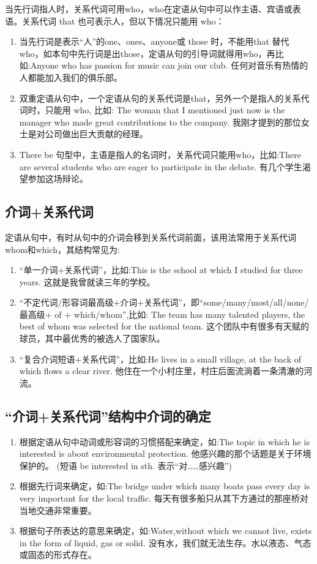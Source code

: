 当先行词指人时，关系代词可用who，who在定语从句中可以作主语、宾语或表语。关系代词 that 也可表示人，但以下情况只能用 who：
\begin{enumerate}
  \item 当先行词是表示“人”的one、ones、anyone或 those 时，不能用that 替代 who，如本句中先行词是出those，定语从句的引导词就得用who，再比如:Anyone who has passion for music can join our club. 任何对音乐有热情的人都能加入我们的俱乐部。
  \item 双重定语从句中，一个定语从句的关系代词是that，另外一个是指人的关系代词时，只能用 who, 比如: The woman that I mentioned just now is the manager who made great contributions to the company. 我刚才提到的那位女士是对公司做出巨大贡献的经理。
  \item There be 句型中，主语是指人的名词时，关系代词只能用who，比如:There are several students who are eager to participate in the debate. 有几个学生渴望参加这场辩论。
\end{enumerate}

\subsection{介词+关系代词}

定语从句中，有时从句中的介词会移到关系代词前面，该用法常用于关系代词whom和which，其结构常见为:
\begin{enumerate}
  \item “单一介词+关系代词”，比如:This is the school at which I studied for three years. 这就是我曾就读三年的学校。
  \item “不定代词/形容词最高级+介词+关系代词”，即“some/many/most/all/none/最高级+ of + which/whom”,比如: The team has many talented players, the best of whom was selected for the national team. 这个团队中有很多有天赋的球员，其中最优秀的被选人了国家队。
  \item “复合介词短语+关系代词”，比如:He lives in a small village, at the back of which flows a clear river. 他住在一个小村庄里，村庄后面流淌着一条清澈的河流。
\end{enumerate}

\subsection{“介词+关系代词”结构中介词的确定}

\begin{enumerate}
  \item 根据定语从句中动词或形容词的习惯搭配来确定，如:The topic in which he is interested is about environmental protection. 他感兴趣的那个话题是关于环境保护的。 (短语 be interested in sth. 表示“对……感兴趣”)
  \item 根据先行词来确定，如:The bridge under which many boats pass every day is very important for the local traffic. 每天有很多船只从其下方通过的那座桥对当地交通非常重要。
  \item 根据句子所表达的意思来确定，如:Water,without which we cannot live, exists in the form of liquid, gas or solid. 没有水，我们就无法生存。水以液态、气态或固态的形式存在。
\end{enumerate}

